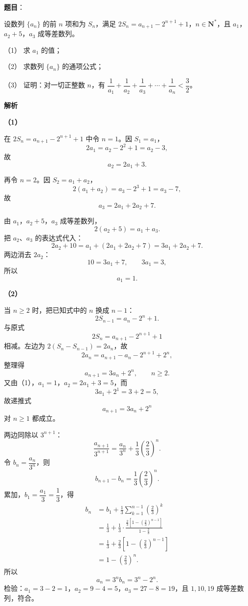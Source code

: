 \begin{answer}

\textbf{题目}：

设数列 $\{a_n\}$ 的前 $n$ 项和为 $S_n$，满足 $2S_n=a_{n+1}-2^{n+1}+1$，$n\in\mathbf N^*$，且 $a_1$，$a_2+5$，$a_3$ 成等差数列。

（1） 求 $a_1$ 的值；

（2） 求数列 $\{a_n\}$ 的通项公式；

（3） 证明：对一切正整数 $n$，有 $\dfrac1{a_1}+\dfrac1{a_2}+\dfrac1{a_3}+\cdots+\dfrac1{a_n}<\dfrac32$。

\textbf{解析}

\textbf{（1）}

在 $2S_n=a_{n+1}-2^{n+1}+1$ 中令 $n=1$。因 $S_1=a_1$，
\nopagebreak[4]
\[2a_1=a_2-2^2+1=a_2-3,\]
故
\nopagebreak[4]
\[a_2=2a_1+3.\]

再令 $n=2$。因 $S_2=a_1+a_2$，
\nopagebreak[4]
\[2(a_1+a_2)=a_3-2^3+1=a_3-7,\]
故
\nopagebreak[4]
\[a_3=2a_1+2a_2+7.\]

由 $a_1$，$a_2+5$，$a_3$ 成等差数列，
\nopagebreak[4]
\[2(a_2+5)=a_1+a_3.\]
把 $a_2$、$a_3$ 的表达式代入：
\nopagebreak[4]
\[2a_2+10=a_1+(2a_1+2a_2+7)=3a_1+2a_2+7.\]
两边消去 $2a_2$：
\nopagebreak[4]
\[10=3a_1+7,\qquad 3a_1=3,\]
所以
\nopagebreak[4]
\[a_1=1.\]

\textbf{（2）}

当 $n\geqslant2$ 时，把已知式中的 $n$ 换成 $n-1$：
\nopagebreak[4]
\[2S_{n-1}=a_n-2^n+1.\]
与原式
\nopagebreak[4]
\[2S_n=a_{n+1}-2^{n+1}+1\]
相减。左边为 $2(S_n-S_{n-1})=2a_n$，故
\nopagebreak[4]
\[2a_n=a_{n+1}-a_n-2^{n+1}+2^n,\]
整理得
\nopagebreak[4]
\[a_{n+1}=3a_n+2^n,\qquad n\geqslant2.\]
又由（1），$a_1=1$，$a_2=2a_1+3=5$，而
\nopagebreak[4]
\[3a_1+2^1=3+2=5,\]
故递推式
\nopagebreak[4]
\[a_{n+1}=3a_n+2^n\]
对 $n\geqslant1$ 都成立。

两边同除以 $3^{n+1}$：
\nopagebreak[4]
\[\frac{a_{n+1}}{3^{n+1}}=\frac{a_n}{3^n}+\frac13\left(\frac23\right)^n.\]
令 $b_n=\dfrac{a_n}{3^n}$，则
\nopagebreak[4]
\[b_{n+1}-b_n=\frac13\left(\frac23\right)^n.\]
累加，$b_1=\dfrac{a_1}{3}=\dfrac13$，得
\nopagebreak[4]
\[\begin{aligned}
b_n&=b_1+\frac13\sum_{k=1}^{n-1}\left(\frac23\right)^k\\
&=\frac13+\frac13\cdot\frac{\frac23\left[1-\left(\frac23\right)^{n-1}\right]}{1-\frac23}\\
&=\frac13+\frac23\left[1-\left(\frac23\right)^{n-1}\right]\\
&=1-\left(\frac23\right)^n.
\end{aligned}\]
所以
\nopagebreak[4]
\[a_n=3^n b_n=3^n-2^n.\]
检验：$a_1=3-2=1$，$a_2=9-4=5$，$a_3=27-8=19$，且 $1,10,19$ 成等差数列，符合。


\end{answer}
